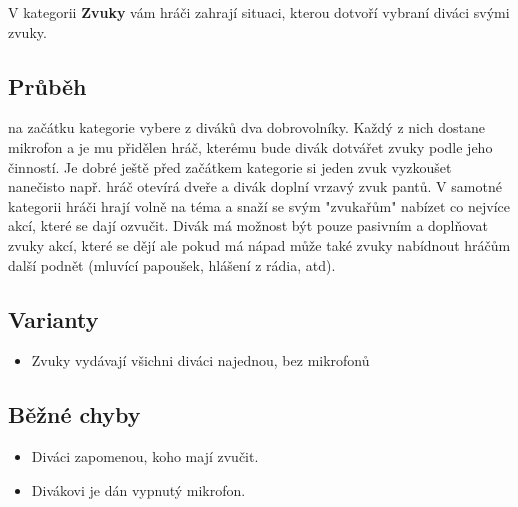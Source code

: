\documentclass[main.tex]{subfiles}
\begin{document}
 
V kategorii \textbf{Zvuky}{} vám hráči zahrají situaci, kterou dotvoří vybraní diváci svými zvuky. 
 
 
\subsection{Průběh}  na začátku kategorie vybere z diváků dva dobrovolníky. Každý z nich dostane mikrofon a je mu přidělen hráč, kterému bude divák dotvářet zvuky podle jeho činností. Je dobré ještě před začátkem kategorie si jeden zvuk vyzkoušet nanečisto např. hráč otevírá dveře a divák doplní vrzavý zvuk pantů. V samotné kategorii hráči hrají volně na téma a snaží se svým "zvukařům"{} nabízet co nejvíce akcí, které se dají ozvučit. Divák má možnost být pouze pasivním a doplňovat zvuky akcí, které se dějí ale pokud má nápad může také zvuky nabídnout hráčům další podnět (mluvící papoušek, hlášení z rádia, atd). 
 
\subsection{ Varianty } \begin{itemize}
\item Zvuky vydávají všichni diváci najednou, bez mikrofonů
\end{itemize}
 
\subsection{ Běžné chyby } \begin{itemize}
\item Diváci zapomenou, koho mají zvučit.
\item Divákovi je dán vypnutý mikrofon.
\end{itemize}
 
 
 
 
\end{document}
